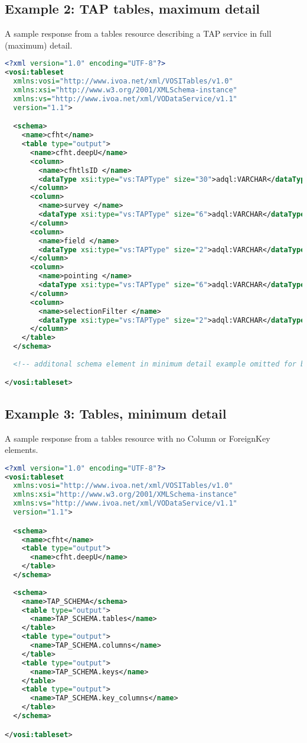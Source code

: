 \documentclass[11pt,letter]{ivoa}
\begin{document}
\subsection{Example 2: TAP tables, maximum detail}

A sample response from a tables resource describing a TAP service in
full (maximum) detail.

\begin{lstlisting}[language=XML]
<?xml version="1.0" encoding="UTF-8"?>
<vosi:tableset
  xmlns:vosi="http://www.ivoa.net/xml/VOSITables/v1.0"
  xmlns:xsi="http://www.w3.org/2001/XMLSchema-instance"
  xmlns:vs="http://www.ivoa.net/xml/VODataService/v1.1"
  version="1.1">

  <schema>
    <name>cfht</name>
    <table type="output">
      <name>cfht.deepU</name>
      <column>
        <name>cfhtlsID </name>
        <dataType xsi:type="vs:TAPType" size="30">adql:VARCHAR</dataType>
      </column>
      <column>
        <name>survey </name>
        <dataType xsi:type="vs:TAPType" size="6">adql:VARCHAR</dataType>
      </column>
      <column>
        <name>field </name>
        <dataType xsi:type="vs:TAPType" size="2">adql:VARCHAR</dataType>
      </column>
      <column>
        <name>pointing </name>
        <dataType xsi:type="vs:TAPType" size="6">adql:VARCHAR</dataType>
      </column>
      <column>
        <name>selectionFilter </name>
        <dataType xsi:type="vs:TAPType" size="2">adql:VARCHAR</dataType>
      </column>
    </table>
  </schema>
  
  <!-- additonal schema element in minimum detail example omitted for brevity -->

</vosi:tableset>
\end{lstlisting}

\subsection{Example 3: Tables, minimum detail}

A sample response from a tables resource with no Column or ForeignKey elements.

\begin{lstlisting}[language=XML]
<?xml version="1.0" encoding="UTF-8"?>
<vosi:tableset
  xmlns:vosi="http://www.ivoa.net/xml/VOSITables/v1.0"
  xmlns:xsi="http://www.w3.org/2001/XMLSchema-instance"
  xmlns:vs="http://www.ivoa.net/xml/VODataService/v1.1"
  version="1.1">

  <schema>
    <name>cfht</name>
    <table type="output">
      <name>cfht.deepU</name>
    </table>
  </schema>
  
  <schema>
    <name>TAP_SCHEMA</schema>
    <table type="output">
      <name>TAP_SCHEMA.tables</name>
    </table>
    <table type="output">
      <name>TAP_SCHEMA.columns</name>
    </table>
    <table type="output">
      <name>TAP_SCHEMA.keys</name>
    </table>
    <table type="output">
      <name>TAP_SCHEMA.key_columns</name>
    </table>
  </schema>

</vosi:tableset>
\end{lstlisting}
\end{document}
